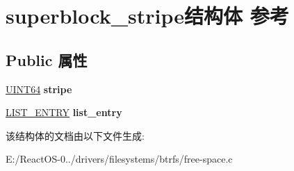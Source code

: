 \hypertarget{structsuperblock__stripe}{}\section{superblock\+\_\+stripe结构体 参考}
\label{structsuperblock__stripe}
\subsection*{Public 属性}
\begin{DoxyCompactItemize}
\item 
\mbox{\label{structsuperblock__stripe_a3a1889b5da1973d03f9e87d686758c5a}} 
\hyperlink{_processor_bind_8h_a57be03562867144161c1bfee95ca8f7c}{U\+I\+N\+T64} {\bfseries stripe}
\item 
\mbox{\label{structsuperblock__stripe_a51b7abe23b43bcb18f68ae798927aace}} 
\hyperlink{struct___l_i_s_t___e_n_t_r_y}{L\+I\+S\+T\+\_\+\+E\+N\+T\+RY} {\bfseries list\+\_\+entry}
\end{DoxyCompactItemize}


该结构体的文档由以下文件生成\+:\begin{DoxyCompactItemize}
\item 
E\+:/\+React\+O\+S-\/0../drivers/filesystems/btrfs/free-\/space.\+c\end{DoxyCompactItemize}
